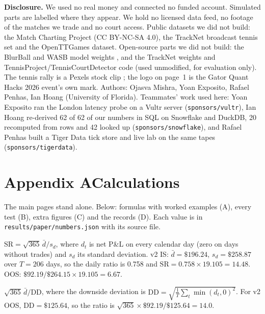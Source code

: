 \documentclass[11pt,letterpaper]{article}
\begin{document}
\vspace{6pt}\noindent\textbf{Disclosure.} We used no real money and connected no funded account. Simulated parts are
labelled where they appear. We hold no licensed data feed, no footage of the matches we trade and no court access.
Public datasets we did not build: the Match Charting Project (CC BY-NC-SA 4.0), the TrackNet broadcast tennis set and
the OpenTTGames dataset. Open-source parts we did not build: the BlurBall and WASB model weights \citep{gossard2026,tarashima2023}, and the
TrackNet weights and TennisProject/TennisCourtDetector code \citep{yastrebksv} (used unmodified, for evaluation only). The tennis rally
is a Pexels stock clip \citep{pexels2021}; the logo on page~1 is the Gator Quant Hacks 2026 event's own mark. Authors:
Ojasva Mishra, Yoan Exposito, Rafael Penhas, Ian Hoang (University of Florida). Teammates' work used here: Yoan Exposito ran the London latency probe on a
Vultr server (\nolinkurl{sponsors/vultr}), Ian Hoang re-derived 62 of 62 of our numbers in SQL on
Snowflake and DuckDB, 20 recomputed from rows and 42 looked up
(\nolinkurl{sponsors/snowflake}), and Rafael Penhas built a Tiger Data tick store and live lab on the same tapes
(\nolinkurl{sponsors/tigerdata}).

\vspace{16pt}
\csappendix
\section*{Appendix A\quad Calculations}
The main pages stand alone. Below: formulas with worked examples (A), every test (B), extra figures (C) and the
records (D). Each value is in \texttt{results/paper/numbers.json} with its source file.

 \(\text{SR} = \sqrt{365}\,\bar d / s_d\), where \(d_t\) is net P\&L on every calendar day
(zero on days without trades) and \(s_d\) its standard deviation. v2 IS: \(\bar d = \$196.24\),
\(s_d = \$258.87\) over \(T = 206\) days, so the daily ratio is 0.758
and \(\text{SR} = 0.758 \times 19.105 = 14.48\). OOS:
\(\$92.19 / \$264.15 \times 19.105 = 6.67\).

 \(\sqrt{365}\,\bar d / \text{DD}\), where the downside deviation is \(\text{DD} =
\sqrt{\tfrac1T\sum_t \min(d_t,0)^2}\). For v2 OOS, \(\text{DD} = \$125.64\), so the ratio is
\(\sqrt{365}\times \$92.19 / \$125.64 = 14.0\).
\end{document}
